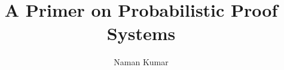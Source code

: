 \documentclass[12pt,a4paper]{article}
\title{\textbf{A Primer on Probabilistic Proof Systems}}
\author{Naman Kumar}
\begin{document}
	\maketitle
	
	\begin{abstract}
	\end{abstract}
	
	\pagebreak
	\tableofcontents
	
	\pagebreak
	
	
	\pagebreak
	
	
	\pagebreak
	
	
	\pagebreak
	
	
	\pagebreak
	
	
	\pagebreak
	
	
	\pagebreak
	
	
	\pagebreak
		
	
	\pagebreak
	\appendix
	
	
	
	
\end{document}
